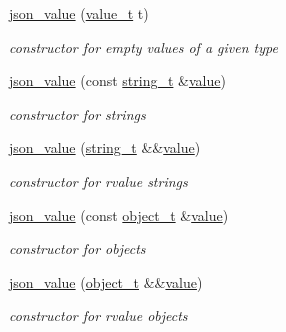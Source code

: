 \begin{DoxyCompactItemize}
\hyperlink{unionnlohmann_1_1basic__json_1_1json__value_a34114e47b2d6391ba97678cefef700c4}{json\+\_\+value} (\hyperlink{namespacenlohmann_1_1detail_a1ed8fc6239da25abcaf681d30ace4985}{value\+\_\+t} t)
\begin{DoxyCompactList}\small\item\em constructor for empty values of a given type \end{DoxyCompactList}\item 
\hyperlink{unionnlohmann_1_1basic__json_1_1json__value_a8f75abc358ee45b9bbdc601c974d6c91}{json\+\_\+value} (const \hyperlink{classnlohmann_1_1basic__json_a61f8566a1a85a424c7266fb531dca005}{string\+\_\+t} \&\hyperlink{classnlohmann_1_1basic__json_adcf8ca5079f5db993820bf50036bf45d}{value})
\begin{DoxyCompactList}\small\item\em constructor for strings \end{DoxyCompactList}\item 
\hyperlink{unionnlohmann_1_1basic__json_1_1json__value_ab9c8696a9477ec8a9bce79dec04ef418}{json\+\_\+value} (\hyperlink{classnlohmann_1_1basic__json_a61f8566a1a85a424c7266fb531dca005}{string\+\_\+t} \&\&\hyperlink{classnlohmann_1_1basic__json_adcf8ca5079f5db993820bf50036bf45d}{value})
\begin{DoxyCompactList}\small\item\em constructor for rvalue strings \end{DoxyCompactList}\item 
\hyperlink{unionnlohmann_1_1basic__json_1_1json__value_a74330ab1bc8ce1d0c6e2ee711c150563}{json\+\_\+value} (const \hyperlink{classnlohmann_1_1basic__json_a5e48a7893520e1314bf0c9723e26ea2a}{object\+\_\+t} \&\hyperlink{classnlohmann_1_1basic__json_adcf8ca5079f5db993820bf50036bf45d}{value})
\begin{DoxyCompactList}\small\item\em constructor for objects \end{DoxyCompactList}\item 
\hyperlink{unionnlohmann_1_1basic__json_1_1json__value_a82815d53bd7c983995fbcbe85131a110}{json\+\_\+value} (\hyperlink{classnlohmann_1_1basic__json_a5e48a7893520e1314bf0c9723e26ea2a}{object\+\_\+t} \&\&\hyperlink{classnlohmann_1_1basic__json_adcf8ca5079f5db993820bf50036bf45d}{value})
\begin{DoxyCompactList}\small\item\em constructor for rvalue objects \end{DoxyCompactList}\item 

\end{DoxyCompactItemize}
